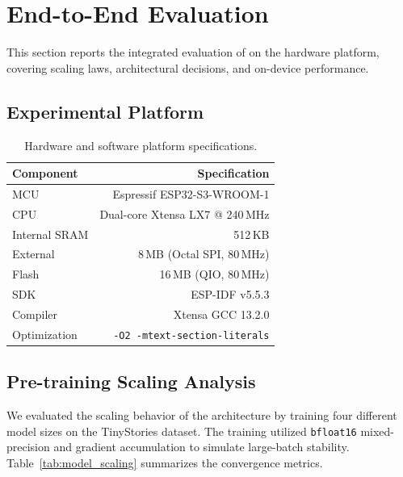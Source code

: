 \section{End-to-End Evaluation}
\label{sec:evaluation}

This section reports the integrated evaluation of \tinybit{} on the \espss{}
hardware platform, covering scaling laws, architectural decisions, and on-device performance.

\subsection{Experimental Platform}

\begin{table}[H]
\centering
\caption{Hardware and software platform specifications.}
\label{tab:platform}
\small
\begin{tabular}{lr}
\toprule
\textbf{Component} & \textbf{Specification} \\
\midrule
MCU                 & Espressif ESP32-S3-WROOM-1 \\
CPU                 & Dual-core Xtensa LX7 @ 240\,MHz \\
Internal SRAM       & 512\,KB \\
External \psram{}   & 8\,MB (Octal SPI, 80\,MHz) \\
Flash               & 16\,MB (QIO, 80\,MHz) \\
SDK                 & ESP-IDF v5.5.3 \\
Compiler            & Xtensa GCC 13.2.0 \\
Optimization        & \texttt{-O2 -mtext-section-literals} \\
\bottomrule
\end{tabular}
\end{table}

\subsection{Pre-training Scaling Analysis}
\label{sec:scaling_analysis}

We evaluated the scaling behavior of the \tinybit{} architecture by training four different model sizes on the TinyStories dataset. The training utilized \texttt{bfloat16} mixed-precision and gradient accumulation to simulate large-batch stability. Table~\ref{tab:model_scaling} summarizes the convergence metrics.

